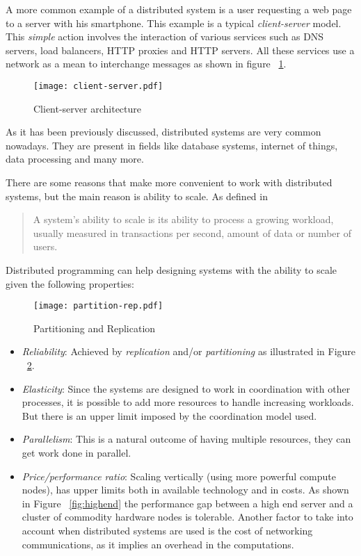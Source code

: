 A more common example of a distributed system is a user requesting a web page to
a server with his smartphone. This example is a typical \textit{client-server}
model. This \textit{simple} action involves the interaction of various services
such as DNS servers, load balancers, HTTP proxies and HTTP servers. All these
services use a network as a mean to interchange messages as shown in figure
~\ref{fig:client-server}.

\begin{figure}[!h]
\begin{center}
\texttt{[image: client-server.pdf]}
\caption{Client-server architecture}
\label{fig:client-server}
\end{center}
\end{figure}

As it has been previously discussed, distributed systems are very common
nowadays. They are present in fields like database systems, internet of things,
data processing and many more.

There are some reasons that make more convenient to work with distributed
systems, but the main reason is ability to scale. As defined in \cite{cloudadmin}
\begin{quote}
  A system's ability to scale is its ability to process a growing workload,
  usually measured in transactions per second, amount of data or number of
  users.
\end{quote}

Distributed programming can help designing systems with the ability to scale given
the following properties:

\begin{figure}[!h]
\begin{center}
\texttt{[image: partition-rep.pdf]}
\caption{Partitioning and Replication}
\label{fig:partitioning}
\end{center}
\end{figure}

\begin{itemize}
\item \textit{Reliability}: Achieved by \textit{replication} and/or
  \textit{partitioning} as illustrated in Figure ~\ref{fig:partitioning}.
\item \textit{Elasticity}: Since the systems are designed to work in
  coordination with other processes, it is possible to add more resources to
  handle increasing workloads. But there is an upper limit imposed by the
  coordination model used.
\item \textit{Parallelism}: This is a natural outcome of having multiple resources, they
  can get work done in parallel.
\item \textit{Price/performance ratio}: Scaling vertically (using more powerful
  compute nodes), has upper limits both in available technology and in costs. As
  shown in Figure ~\ref{fig:highend} the performance gap between a high end
  server and a cluster of commodity hardware nodes is tolerable. Another factor
  to take into account when distributed systems are used is the cost of
  networking communications, as it implies an overhead in the computations.
\end{itemize}


